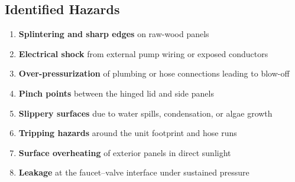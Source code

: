 \documentclass[12pt]{report}
\begin{document}
\subsection{Identified Hazards}
\begin{enumerate}[leftmargin=1.5cm]
  \item \textbf{Splintering and sharp edges} on raw-wood panels
  \item \textbf{Electrical shock} from external pump wiring or exposed conductors
  \item \textbf{Over-pressurization} of plumbing or hose connections leading to blow-off
  \item \textbf{Pinch points} between the hinged lid and side panels
  \item \textbf{Slippery surfaces} due to water spills, condensation, or algae growth
  \item \textbf{Tripping hazards} around the unit footprint and hose runs
  \item \textbf{Surface overheating} of exterior panels in direct sunlight
  \item \textbf{Leakage} at the faucet–valve interface under sustained pressure
\end{enumerate}
\end{document}
